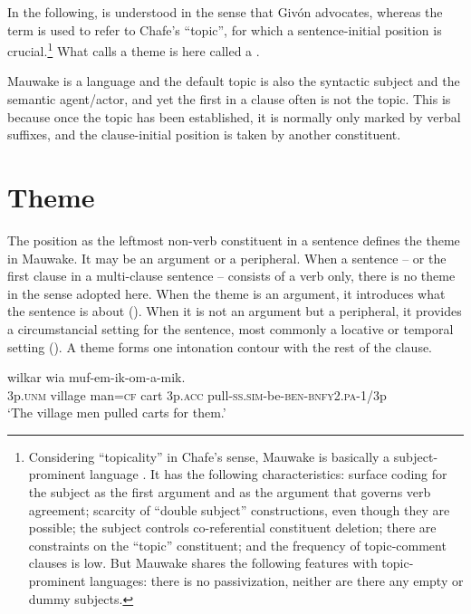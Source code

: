 In the following,  is understood in the sense that Giv\'on advocates, whereas the term  is used to refer to Chafe's ``topic'', for which a sentence-initial position is crucial.\footnote{Considering ``topicality'' in Chafe's sense, Mauwake is basically a subject-prominent language \citep{LiEtAl1976}. It has the following characteristics: surface coding for the subject as the first argument and as the argument that governs verb agreement; scarcity of ``double subject'' constructions, even though they are possible; the subject controls co-referential constituent deletion; there are constraints on the ``topic'' constituent; and the frequency of topic-comment clauses is low. But Mauwake shares the following  features with topic-prominent languages: there is no passivization, neither are there any empty or dummy subjects.} What \citet[19]{Dik1978} calls a theme is here called a .

Mauwake is a  language and the default topic is also the syntactic subject and the semantic agent/actor, and yet the first  in a clause often is not the topic. This is because once the topic has been established, it is normally only marked by verbal suffixes, and the clause-initial position is taken by another constituent.  

\section{Theme}

The position as the leftmost non-verb constituent in a sentence defines the theme in Mauwake. It may be an argument or a peripheral. When a sentence -- or the first clause in a multi-clause sentence -- consists of a verb only, there is no theme in the sense adopted here. When the theme is an argument, it introduces what the sentence is about (). When it is not an argument but a peripheral, it provides a circumstancial setting for the sentence, most commonly a locative or temporal setting (). A theme forms one intonation contour with the rest of the clause. 

\ea%
\label{ex:x1908}
\gll {}     wilkar  wia  muf-em-ik-om-a-mik.\\
3p.\textsc{unm} village  man=\textsc{cf}  cart  3p.\textsc{acc}  pull-\textsc{ss}.\textsc{sim}-be-\textsc{ben}-\textsc{bnfy}2.\textsc{pa}-1/3p     \\
\glt`The village men pulled carts for them.'
\z


